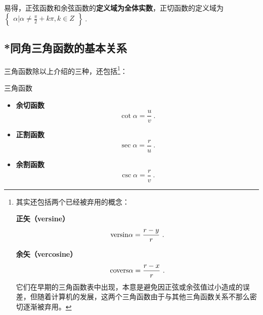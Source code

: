 易得，正弦函数和余弦函数的\textbf{定义域为全体实数}，正切函数的定义域为 $\begin{Bmatrix}\alpha|\alpha \neq \frac{\pi}{2}+k\pi,k\in Z\end{Bmatrix}~.$

\subsection{*同角三角函数的基本关系}
三角函数除以上介绍的三种，还包括\footnote{其实还包括两个已经被弃用的概念：

\textbf{正矢（versine）}\begin{equation}
\mathrm{versin }\alpha=\displaystyle{r-y\over r}~.
\end{equation}

\textbf{余矢（vercosine）}
\begin{equation}
\mathrm{covers }\alpha=\displaystyle{r-x\over r}~.
\end{equation}
它们在早期的三角函数表中出现，本意是避免因正弦或余弦值过小造成的误差，但随着计算机的发展，这两个三角函数由于与其他三角函数关系不那么密切逐渐被弃用。}：
\begin{definition}{三角函数}
\begin{itemize}
\item \textbf{余切函数}
\begin{equation}
\displaystyle\cot \alpha = \frac{u}{v}~.
\end{equation}
\item \textbf{正割函数}
\begin{equation}
\displaystyle\sec \alpha = \frac{r}{u}~.
\end{equation}
\item \textbf{余割函数}
\begin{equation}
\displaystyle\csc \alpha = \frac{r}{v}~.
\end{equation}
\end{itemize}
\end{definition}

